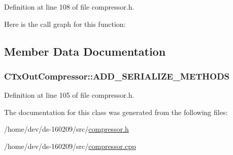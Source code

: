 Definition at line 108 of file compressor.\+h.



Here is the call graph for this function\+:




\subsection{Member Data Documentation}
\hypertarget{class_c_tx_out_compressor_a520b323886560ededcfe303c4672481e}{}
\subsubsection[{A\+D\+D\+\_\+\+S\+E\+R\+I\+A\+L\+I\+Z\+E\+\_\+\+M\+E\+T\+H\+O\+D\+S}]{\setlength{\rightskip}{0pt plus 5cm}C\+Tx\+Out\+Compressor\+::\+A\+D\+D\+\_\+\+S\+E\+R\+I\+A\+L\+I\+Z\+E\+\_\+\+M\+E\+T\+H\+O\+D\+S}\label{class_c_tx_out_compressor_a520b323886560ededcfe303c4672481e}


Definition at line 105 of file compressor.\+h.



The documentation for this class was generated from the following files\+:\begin{DoxyCompactItemize}
\item 
/home/dev/ds-\/160209/src/\hyperlink{compressor_8h}{compressor.\+h}\item 
/home/dev/ds-\/160209/src/\hyperlink{compressor_8cpp}{compressor.\+cpp}\end{DoxyCompactItemize}
